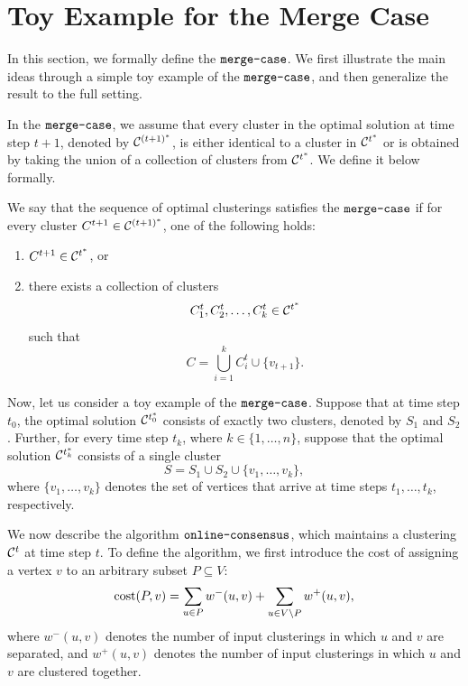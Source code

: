 \section{Toy Example for the Merge Case}

In this section, we formally define the $\mcase$. We first illustrate the main ideas through a simple toy example of the $\mcase$, and then generalize the result to the full setting.

In the $\mcase$, we assume that every cluster in the optimal solution at time step $t+1$, denoted by $\mathcal{C}^{(t+1)^*}$, is either identical to a cluster in $\mathcal{C}^{t^*}$ or is obtained by taking the union of a collection of clusters from $\mathcal{C}^{t^*}$. We define it below formally.

\begin{definition}[$\mcase$]
We say that the sequence of optimal clusterings satisfies the $\mcase$ if for every cluster
$C^{t + 1} \in \mathcal{C}^{(t+1)^*}$, one of the following holds:
\begin{enumerate}
    \item $C^{t + 1} \in \mathcal{C}^{t^*}$, or
    \item there exists a collection of clusters
    \[
    C_1^{t}, C_2^{t}, \ldots, C_k^{t} \in \mathcal{C}^{t^*}
    \]
    such that
    \[
    C = \bigcup_{i=1}^k C_i^{t} \cup \{v_{t+1}\}.
    \]
\end{enumerate}
\end{definition}

Now, let us consider a toy example of the $\mcase$. Suppose that at time step $t_0$, the optimal solution $\optcls{0}$ consists of exactly two clusters, denoted by $S_1$ and $S_2$. Further, for every time step $t_k$, where $k \in \{1,\ldots,n\}$, suppose that the optimal solution $\optcls{k}$ consists of a single cluster
\[
    S = S_1 \cup S_2 \cup \{v_1,\ldots,v_k\},
\]
where $\{v_1,\ldots,v_k\}$ denotes the set of vertices that arrive at time steps $t_1,\ldots,t_k$, respectively.

We now describe the algorithm $\texttt{online-consensus}$, which maintains a clustering $\mathcal{C}^{t}$ at time step $t$. To define the algorithm, we first introduce the cost of assigning a vertex $v$ to an arbitrary subset $P \subseteq V$:
\[
    \text{cost}(P,v)
    =
    \sum_{u \in P} w^{-}(u,v)
    +
    \sum_{u \in V \setminus P} w^{+}(u,v),
\]
where $w^{-}(u,v)$ denotes the number of input clusterings in which $u$ and $v$ are separated, and $w^{+}(u,v)$ denotes the number of input clusterings in which $u$ and $v$ are clustered together.

